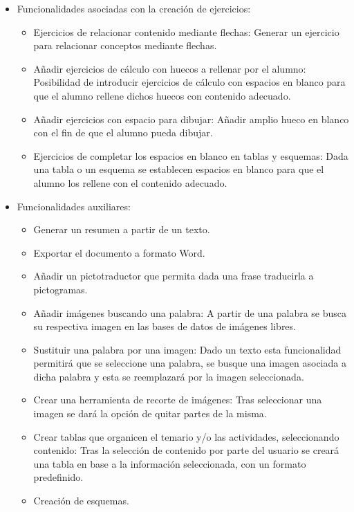 \begin{itemize}
  \item Funcionalidades asociadas con la creación de ejercicios:
        \begin{itemize}
          \item Ejercicios de relacionar contenido mediante flechas: Generar un ejercicio para relacionar conceptos mediante flechas.
          \item Añadir ejercicios de cálculo con huecos a rellenar por el alumno: Posibilidad de introducir ejercicios de cálculo con espacios en blanco para que el alumno rellene dichos huecos con contenido adecuado.
          \item Añadir ejercicios con espacio para dibujar: Añadir amplio hueco en blanco con el fin de que el alumno pueda dibujar.
          \item Ejercicios de completar los espacios en blanco en tablas y esquemas: Dada una tabla o un esquema se establecen espacios en blanco para que el alumno los rellene con el contenido adecuado.
        \end{itemize}

  \item Funcionalidades auxiliares:
        \begin{itemize}
          \item Generar un resumen a partir de un texto.
          \item Exportar el documento a formato Word.
          \item Añadir un pictotraductor que permita dada una frase traducirla a pictogramas.
          \item Añadir imágenes buscando una palabra: A partir de una palabra se busca su respectiva imagen en las bases de datos de imágenes libres.
          \item Sustituir una palabra por una imagen: Dado un texto esta funcionalidad permitirá que se seleccione una palabra, se busque una imagen asociada a dicha palabra y esta se reemplazará por la imagen seleccionada.
          \item Crear una herramienta de recorte de imágenes: Tras seleccionar una imagen se dará la opción de quitar partes de la misma.
          \item Crear tablas que organicen el temario y/o las actividades, seleccionando contenido: Tras la selección de contenido por parte del usuario se creará una tabla en base a la información seleccionada, con un formato predefinido.
          \item Creación de esquemas.
        \end{itemize}

\end{itemize}

